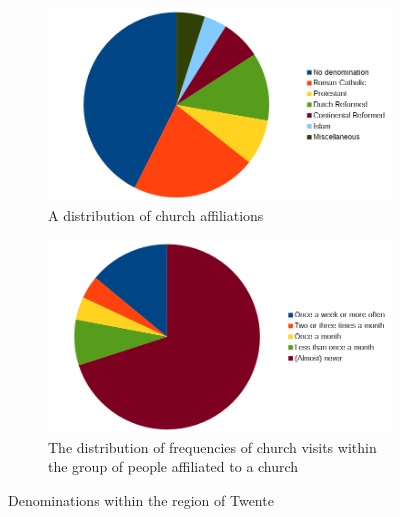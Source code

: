 \begin{figure}
    \centering
    \begin{subfigure}[b]{0.7\textwidth}
        \includegraphics[width=\textwidth]{img/denominations.png}
        \begin{center}
            \caption{A distribution of church affiliations}
            \label{fig:denominations}
        \end{center}
    \end{subfigure}
    \begin{subfigure}[b]{0.7\textwidth}
        \includegraphics[width=\textwidth]{img/churchvisits.png}
        \begin{center}
            \caption{The distribution of frequencies of church visits within the group of people affiliated to a church}
            \label{fig:churchvisits}
        \end{center}
    \end{subfigure}
    \caption{Denominations within the region of Twente \protect\cite{cbsdenom}}
    \label{fig:religion}
\end{figure}

